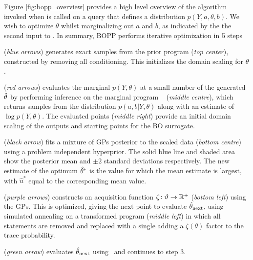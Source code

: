 Figure \ref{fig:bopp_overview} provides a high level overview of the algorithm invoked when \doopt is called on a query  that defines a distribution $p\left(Y, a, \theta , b\right)$.  We wish to optimize $\theta$ whilst marginalizing out $a$ and $b$, as indicated by the the second input to . In summary, BOPP performs iterative optimization in 5 steps
\begin{description}[align=left]
	\setlength\itemsep{-0.1em}
	\item[Step 1] (\emph{blue arrows}) generates exact samples from the prior program  (\emph{top center}), constructed by removing all conditioning. This initializes the domain scaling for $\theta$.
	\item[Step 2] (\emph{red arrows}) evaluates the marginal $p(Y,\theta)$ at a small number of the generated $\hat{\theta}$ by performing inference on the marginal program \qmarg~ (\emph{middle centre}), which returns samples from the distribution $p\left(a,b | Y, \theta\right)$ along with an estimate of $\log p(Y, \theta)$.  The evaluated points (\emph{middle right}) provide an initial domain scaling of the outputs and starting points for the BO surrogate.
	\item[Step 3] (\emph{black arrow}) fits a mixture of GPs posterior \cite{rasmussen2006gaussian} to the scaled data (\emph{bottom centre}) using a problem independent hyperprior. The solid blue line and shaded area show the posterior mean and $\pm2$ standard deviations respectively. The new estimate of the optimum $\hat{\theta}^*$ is the value for which the mean estimate is largest, with $\hat{u}^*$ equal to the corresponding mean value.    
	\item[Step 4] (\emph{purple arrows}) constructs an acquisition function $\zeta \colon \vartheta \rightarrow \mathbb{R}^+$ (\emph{bottom left}) using the GPs.  This is optimized, giving the next point to evaluate $\hat{\theta}_{\mathrm{next}}$, using simulated annealing on a transformed program  (\emph{middle left}) in which all \observe statements are removed and replaced with a single \observe adding a $\zeta(\theta)$ factor to the trace probability. %
	\item[Step 5] (\emph{green arrow}) evaluates $\hat{\theta}_{\mathrm{next}}$ using \qmarg~and continues to step 3.
\end{description}

